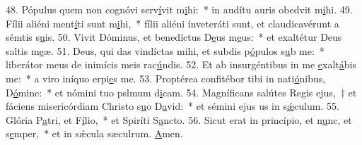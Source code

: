 48. Pópulus quem non cognóvi serv\uline{í}vit m\uline{i}hi:~* in audítu auris obedvit m\uline{i}hi.
49. Fílii aliéni ment\uline{í}ti sunt m\uline{i}hi,~* fílii aliéni inveteráti sunt, et claudicavérunt a sémtis s\uline{u}is.
50. Vivit Dóminus, et benedíctus D\uline{e}us m\uline{e}us:~* et exaltétur Deus saltis m\uline{e}æ.
51. Deus, qui das vindíctas mihi, et subdis p\uline{ó}pulos s\uline{u}b me:~* liberátor meus de inimícis meis rac\uline{ú}ndis.
52. Et ab insurgéntibus in me \uline{e}xalt\uline{á}bis me:~* a viro iníquo erpi\uline{e}s me.
53. Proptérea confitébor tibi in nati\uline{ó}nibus, D\uline{ó}mine:~* et nómini tuo pslmum d\uline{i}cam.
54. Magníficans salútes Regis ejus,~† et fáciens misericórdiam Christo s\uline{u}o D\uline{a}vid:~* et sémini ejus us in s\uline{ǽ}culum.
55. Glória P\uline{a}tri, et F\uline{í}lio,~* et Spiríti S\uline{a}ncto.
56. Sicut erat in princípio, et n\uline{u}nc, et s\uline{e}mper,~* et in sǽcula sæculrum. \uline{A}men.
